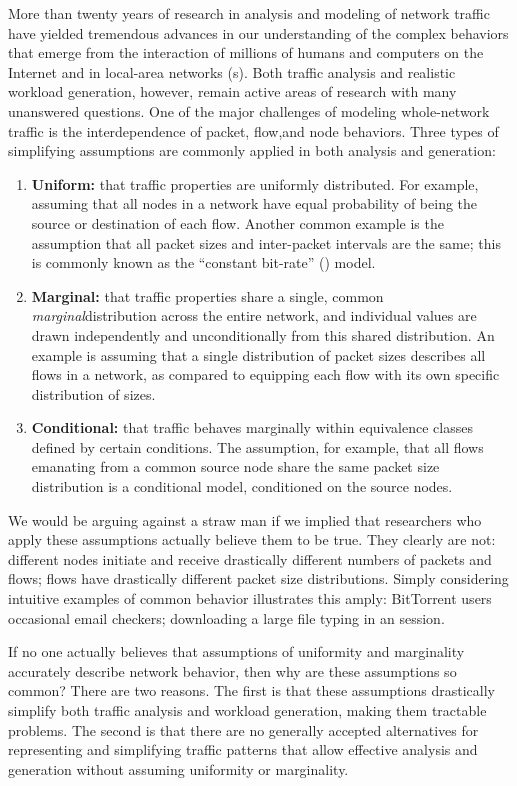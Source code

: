 \documentclass[twocolumn,final]{svjour3}
\begin{document}
More than twenty years of research in analysis and modeling of network traffic have yielded tremendous advances in our understanding of the complex behaviors that emerge from the interaction of millions of humans and computers on the Internet and in local-area networks (s).
Both traffic analysis and realistic workload generation, however, remain active areas of research with many unanswered questions.
One of the major challenges of modeling whole-network traffic is the interdependence of packet, flow,\flownote and node behaviors.
Three types of simplifying assumptions are commonly applied in both analysis and generation:
\begin{enumerate}
\item \textbf{Uniform:} that traffic properties are uniformly distributed. For example, assuming that  all nodes in a network have equal probability of being the source or destination of each flow.
Another common example is the assumption that all packet sizes and inter-packet intervals are the same; this is commonly known as the ``constant bit-rate'' () model.
\item \textbf{Marginal:} that traffic properties share a single, common \emph{marginal}\marginalnote distribution across the entire network, and individual values are drawn independently and unconditionally from this shared distribution.
An example is assuming that a single distribution of packet sizes describes all flows in a network, as compared to equipping each flow with its own specific distribution of sizes.
\item \textbf{Conditional:} that traffic behaves marginally within equivalence classes defined by certain conditions.
The assumption, for example, that all flows emanating from a common source node share the same packet size distribution is a conditional model, conditioned on the source nodes.
\end{enumerate}
We would be arguing against a straw man if we implied that researchers who apply these assumptions actually believe them to be true.
They clearly are not:
different nodes initiate and receive drastically different numbers of packets and flows;
flows have drastically different packet size distributions.
Simply considering intuitive examples of common behavior illustrates this amply:
BitTorrent users  occasional email checkers;
downloading a large file  typing in an  session.

If no one actually believes that assumptions of uniformity and marginality accurately describe network behavior, then why are these assumptions so common?
There are two reasons.
The first is that these assumptions drastically simplify both traffic analysis and workload generation, making them tractable problems.
The second is that there are no generally accepted alternatives for representing and simplifying traffic patterns that allow effective analysis and generation without assuming uniformity or marginality.
\end{document}
